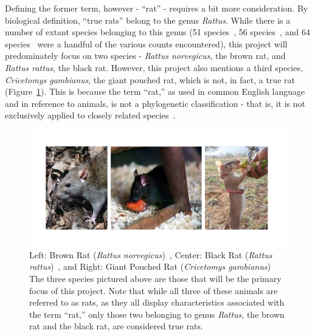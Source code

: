 \documentclass[12pt]{article}
\begin{document}
Defining the former term, however - ``rat'' - requires a bit more consideration. By biological definition, ``true rats'' belong to the genus \textit{Rattus}. While there is a number of extant species belonging to this genus (51 species~\cite{Hanson2012}, 56 species~\cite{EncyclopediaBritannica2014}, and 64 species~\cite{RatWikipedia2014} were a handful of the various counts encountered), this project will predominately focus on two species - \textit{Rattus norvegicus}, the brown rat, and \textit{Rattus rattus}, the black rat. However, this project also mentions a third species, \textit{Cricetomys gambianus}, the giant pouched rat, which is not, in fact, a true rat (Figure~\ref{RatVariationsFigure}). This is because the term ``rat,'' as used in common English language and in reference to animals, is not a phylogenetic classification - that is, it is not exclusively applied to closely related species~\cite{Hanson2012}.
\begin{figure}
\centering
\includegraphics[width=6in,trim={0 .4in 0 .4in},clip]{RatVariations}
\caption{Left: Brown Rat (\textit{Rattus norvegicus})~\cite{BrownRatWikipedia2014}, Center: Black Rat (\textit{Rattus rattus})~\cite{BlackRatWikipedia2014}, and Right: Giant Pouched Rat (\textit{Cricetomys gambianus})~\cite{GiantPouchedRatWikipedia2014}\\
The three species pictured above are those that will be the primary focus of this project. Note that while all three of these animals are referred to as rats, as they all display characteristics associated with the term ``rat,'' only those two belonging to genus \textit{Rattus}, the brown rat and the black rat, are considered true rats.}
\label{RatVariationsFigure}
\end{figure}
\end{document}
